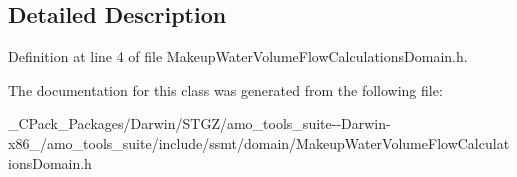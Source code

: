 \subsection{Detailed Description}


Definition at line 4 of file Makeup\+Water\+Volume\+Flow\+Calculations\+Domain.\+h.



The documentation for this class was generated from the following file\+:\begin{DoxyCompactItemize}
\item 
\+\_\+\+C\+Pack\+\_\+\+Packages/\+Darwin/\+S\+T\+G\+Z/amo\+\_\+tools\+\_\+suite-\/-\/\+Darwin-\/x86\+\_/amo\+\_\+tools\+\_\+suite/include/ssmt/domain/Makeup\+Water\+Volume\+Flow\+Calculations\+Domain.\+h\end{DoxyCompactItemize}
